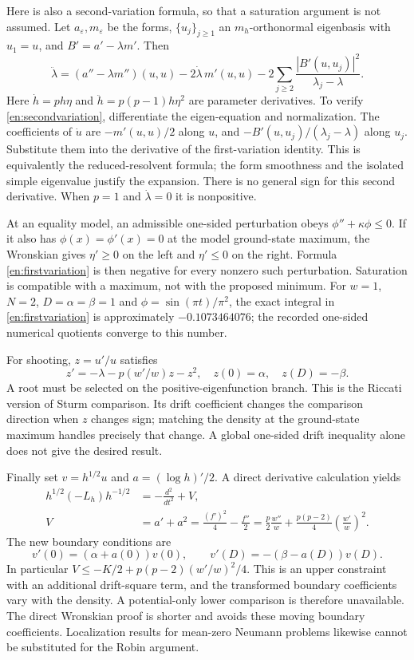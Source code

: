 \documentclass[12pt]{amsart}
\theoremstyle{definition}
\theoremstyle{remark}
\numberwithin{equation}{section}
\begin{document}
Here is also a second-variation formula, so that a saturation argument is not assumed. Let $a_\varepsilon,m_\varepsilon$ be the forms, $\{u_j\}_{j\ge1}$ an $m_h$-orthonormal eigenbasis with $u_1=u$, and $B'=a'-\lambda m'$. Then
\begin{equation}\label{en:secondvariation}
 \ddot\lambda=(a''-\lambda m'')(u,u)-2\dot\lambda\,m'(u,u)
 -2\sum_{j\ge2}\frac{|B'(u,u_j)|^2}{\lambda_j-\lambda}.
\end{equation}
Here $\dot h=p h\eta$ and $\ddot h=p(p-1)h\eta^2$ are parameter derivatives. To verify \eqref{en:secondvariation}, differentiate the eigen-equation and normalization. The coefficients of $\dot u$ are $-m'(u,u)/2$ along $u$, and $-B'(u,u_j)/(\lambda_j-\lambda)$ along $u_j$. Substitute them into the derivative of the first-variation identity. This is equivalently the reduced-resolvent formula; the form smoothness and the isolated simple eigenvalue justify the expansion. There is no general sign for this second derivative. When $p=1$ and $\dot\lambda=0$ it is nonpositive.

At an equality model, an admissible one-sided perturbation obeys $\phi''+\kappa\phi\le0$. If it also has $\phi(x)=\phi'(x)=0$ at the model ground-state maximum, the Wronskian gives $\eta'\ge0$ on the left and $\eta'\le0$ on the right. Formula \eqref{en:firstvariation} is then negative for every nonzero such perturbation. Saturation is compatible with a maximum, not with the proposed minimum. For $w=1$, $N=2$, $D=\alpha=\beta=1$ and $\phi=\sin(\pi t)/\pi^2$, the exact integral in \eqref{en:firstvariation} is approximately $-0.1073464076$; the recorded one-sided numerical quotients converge to this number.

For shooting, $z=u'/u$ satisfies
\[
 z'=-\lambda-p(w'/w)z-z^2,\quad z(0)=\alpha,\quad z(D)=-\beta.
\]
A root must be selected on the positive-eigenfunction branch. This is the Riccati version of Sturm comparison. Its drift coefficient changes the comparison direction when $z$ changes sign; matching the density at the ground-state maximum handles precisely that change. A global one-sided drift inequality alone does not give the desired result.

Finally set $v=h^{1/2}u$ and $a=(\log h)'/2$. A direct derivative calculation yields
\begin{align*}
 h^{1/2}(-L_h)h^{-1/2}&=-\frac{d^2}{dt^2}+V,\\
 V&=a'+a^2=\frac{(f')^2}{4}-\frac{f''}{2}
 =\frac p2\frac{w''}{w}+\frac{p(p-2)}4\left(\frac{w'}w\right)^2.
\end{align*}
The new boundary conditions are
\[
 v'(0)=(\alpha+a(0))v(0),\qquad
 v'(D)=-(\beta-a(D))v(D).
\]
In particular
$V\le-K/2+p(p-2)(w'/w)^2/4$.
This is an upper constraint with an additional drift-square term, and the transformed boundary coefficients vary with the density. A potential-only lower comparison is therefore unavailable. The direct Wronskian proof is shorter and avoids these moving boundary coefficients. Localization results for mean-zero Neumann problems likewise cannot be substituted for the Robin argument.
\end{document}
